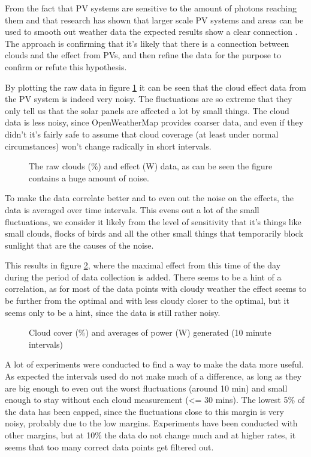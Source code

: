 From the fact that PV systems are sensitive to the amount of photons
reaching them and that research has shown that larger scale PV systems
and areas can be used to smooth out weather data the expected results
show a clear connection \citep{southafrica, cloudTrack, photovoltaic}.
The approach is confirming that it's likely that there is a connection
between clouds and the effect from PVs, and then refine the data for
the purpose to confirm or refute this hypothesis.

By plotting the raw data in figure \ref{fig:noise} it can be seen that
the cloud effect data from the PV system is indeed very noisy.  The
fluctuations are so extreme that they only tell us that the solar
panels are affected a lot by small things.  The cloud data is less
noisy, since OpenWeatherMap provides coarser data, and even if they
didn't it's fairly safe to assume that cloud coverage (at least under
normal circumstances) won't change radically in short intervals.

\begin{figure}
  \centering
  \tiny
  
  \caption{The raw clouds (\%) and effect (W) data, as can be seen the
    figure contains a huge amount of noise.}
  \label{fig:noise}
\end{figure}

To make the data correlate better and to even out the noise on the
effects, the data is averaged over time intervals.  This evens out a
lot of the small fluctuations, we consider it likely from the level of
sensitivity that it's things like small clouds, flocks of birds and
all the other small things that temporarily block sunlight that are
the causes of the noise.

This results in figure \ref{fig:cloudsAndPower}, where the maximal
effect from this time of the day during the period of data collection
is added.  There seems to be a hint of a correlation, as for most of
the data points with cloudy weather the effect seems to be further
from the optimal and with less cloudy closer to the optimal, but it
seems only to be a hint, since the data is still rather noisy.

\begin{figure}
  \centering
  \tiny
  
  \caption{Cloud cover (\%) and averages of power (W) generated (10 minute
    intervals)}
  \label{fig:cloudsAndPower}
\end{figure}

A lot of experiments were conducted to find a way to make the data
more useful.  As expected the intervals used do not make much of a
difference, as long as they are big enough to even out the worst
fluctuations (around 10 min) and small enough to stay without each
cloud measurement (<= 30 mins).  The lowest 5\% of the data has been
capped, since the fluctuations close to this margin is very noisy,
probably due to the low margins. Experiments have been conducted with
other margins, but at 10\% the data do not change much and at higher
rates, it seems that too many correct data points get filtered out.

